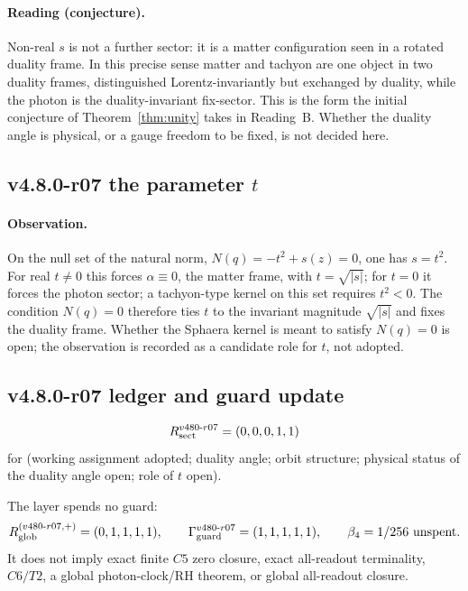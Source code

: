 \paragraph{Reading (conjecture).}
Non-real \(s\) is not a further sector: it is a matter configuration seen in a rotated duality frame.
In this precise sense matter and tachyon are one object in two duality frames, distinguished
Lorentz-invariantly but exchanged by duality, while the photon is the duality-invariant fix-sector.
This is the form the initial conjecture of Theorem~\ref{thm:unity} takes in Reading~B.  Whether the
duality angle is physical, or a gauge freedom to be fixed, is not decided here.

\subsection*{v4.8.0-r07 the parameter \texorpdfstring{$t$}{t}}
\label{subsec:v480-r07-parameter-t}

\paragraph{Observation.}
On the null set of the natural norm, \(N(q)=-t^2+s(z)=0\), one has \(s=t^2\).  For real
\(t\neq0\) this forces \(\alpha\equiv0\), the matter frame, with \(t=\sqrt{|s|}\); for \(t=0\) it forces
the photon sector; a tachyon-type kernel on this set requires \(t^2<0\).  The condition \(N(q)=0\)
therefore ties \(t\) to the invariant magnitude \(\sqrt{|s|}\) and fixes the duality frame.  Whether
the Sphaera kernel is meant to satisfy \(N(q)=0\) is open; the observation is recorded as a candidate
role for \(t\), not adopted.

\subsection*{v4.8.0-r07 ledger and guard update}
\label{subsec:v480-r07-ledger-guard}

\[
R_{\rm sect}^{v480\text{-}r07}=(0,0,0,1,1)
\]
for (working assignment adopted; duality angle; orbit structure; physical status of the duality angle
open; role of \(t\) open).

The layer spends no guard:
\[
R_{\rm glob}^{(v480\text{-}r07,+)}=(0,1,1,1,1),
\qquad
\Gamma_{\rm guard}^{v480\text{-}r07}=(1,1,1,1,1),
\qquad
\beta_4=1/256\ \text{unspent}.
\]
It does not imply exact finite \(C5\) zero closure, exact all-readout terminality,
\(C6/T2\), a global photon-clock/RH theorem, or global all-readout closure.

